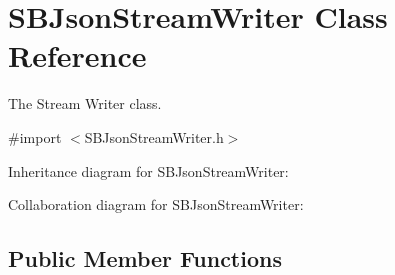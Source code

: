 \hypertarget{interface_s_b_json_stream_writer}{
\section{\-S\-B\-Json\-Stream\-Writer \-Class \-Reference}
\label{interface_s_b_json_stream_writer}
}


\-The \-Stream \-Writer class.  




{\ttfamily \#import $<$\-S\-B\-Json\-Stream\-Writer.\-h$>$}



\-Inheritance diagram for \-S\-B\-Json\-Stream\-Writer\-:


\-Collaboration diagram for \-S\-B\-Json\-Stream\-Writer\-:
\subsection*{\-Public \-Member \-Functions}
